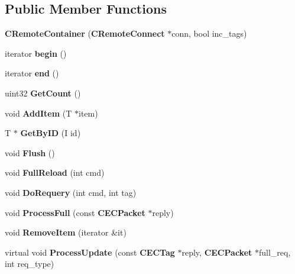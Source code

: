 \subsection*{Public Member Functions}
\begin{DoxyCompactItemize}
\item 
{\bfseries CRemoteContainer} ({\bf CRemoteConnect} $\ast$conn, bool inc\_\-tags)\label{classCRemoteContainer_a51ce3403af183814017b33f0841de3b9}

\item 
iterator {\bfseries begin} ()\label{classCRemoteContainer_aa72884d88da3a04a4a0ffd01a6569c5b}

\item 
iterator {\bfseries end} ()\label{classCRemoteContainer_a621924bc46a410719eabfd4ac9e04e11}

\item 
uint32 {\bfseries GetCount} ()\label{classCRemoteContainer_ad24df38eabb0f5e9332fd2a1cff31215}

\item 
void {\bfseries AddItem} (T $\ast$item)\label{classCRemoteContainer_ae09af8299c4eb8c6a50e690642e67bae}

\item 
T $\ast$ {\bfseries GetByID} (I id)\label{classCRemoteContainer_a8ac0205b6a056009b643105bbdbef55e}

\item 
void {\bfseries Flush} ()\label{classCRemoteContainer_ade1c7ea36f6b93cc9f610480bdb2c08f}

\item 
void {\bfseries FullReload} (int cmd)\label{classCRemoteContainer_a08e69987f1dcd3fa8c6beba2ba097202}

\item 
void {\bfseries DoRequery} (int cmd, int tag)\label{classCRemoteContainer_ae9274ceac5b096de308c993b716ed540}

\item 
void {\bfseries ProcessFull} (const {\bf CECPacket} $\ast$reply)\label{classCRemoteContainer_acf48b44473823067920675b59c1c5d9e}

\item 
void {\bfseries RemoveItem} (iterator \&it)\label{classCRemoteContainer_a369413f060f05fde1840f51bd45c8395}

\item 
virtual void {\bfseries ProcessUpdate} (const {\bf CECTag} $\ast$reply, {\bf CECPacket} $\ast$full\_\-req, int req\_\-type)\label{classCRemoteContainer_abc9b98d351c77baccd0c8cbbdd15fa4f}


\end{DoxyCompactItemize}
